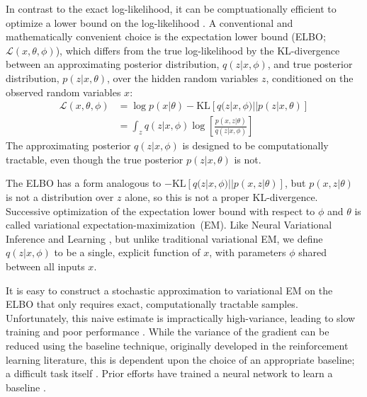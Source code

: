 \documentclass{article} %
\def\KL{\text{KL}}
\begin{document}
In contrast to the exact log-likelihood, it can be comptuationally efficient to optimize a lower bound on the log-likelihood \cite{jordan1999introduction}.  A conventional and mathematically convenient choice is the expectation lower bound (ELBO; $\mathcal{L}(x, \theta, \phi)$), which differs from the true log-likelihood by the KL-divergence between an approximating posterior distribution, $q(z | x, \phi)$, and true posterior distribution, $p(z | x, \theta)$, over the hidden random variables $z$, conditioned on the observed random variables $x$:  
\begin{align}
\mathcal{L}(x, \theta, \phi) &= \log p(x | \theta) - \KL[q(z | x, \phi)||p(z|x,\theta)] \label{variational-inference-equation} \\
&= \int_z q(z | x, \phi) \log\left[ \frac{p(x, z | \theta)}{q(z | x, \phi)} \right] \nonumber %
\end{align}
The approximating posterior $q(z | x, \phi)$ is designed to be computationally tractable, even though the true posterior $p(z | x, \theta)$ is not.  

The ELBO has a form analogous to $-\KL\left[q(z|x, \phi) || p(x,z|\theta)\right]$, but $p(x,z|\theta)$ is not a distribution over $z$ alone, so this is not a proper KL-divergence.  
Successive optimization of the expectation lower bound with respect to $\phi$ and $\theta$ is called variational expectation-maximization~(EM).
Like Neural Variational Inference and Learning \cite{mnih2014neural}, but unlike traditional variational EM, we define $q(z | x, \phi)$ to be a single, explicit function of $x$, with parameters $\phi$ shared between all inputs $x$.

It is easy to construct a stochastic approximation to variational EM on the ELBO that only requires exact, computationally tractable samples.  Unfortunately, this naive estimate is impractically high-variance, leading to slow training and poor performance \cite{paisley2012variational}.  While the variance of the gradient can be reduced using the baseline technique, originally developed in the reinforcement learning literature, this is dependent upon the choice of an appropriate baseline; a difficult task itself \cite{williams1992simple}.  Prior efforts have trained a neural network to learn a baseline \cite{mnih2014neural}.  
\end{document}

